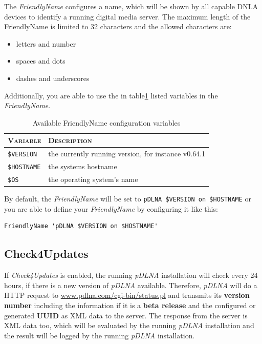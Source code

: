 \documentclass[a4paper,oneside,10pt]{report}
\newenvironment{colframefile}{%
  \begin{Sbox}
    \begin{minipage}{.99\columnwidth}
}{%
  \end{minipage}
  \end{Sbox}
  \begin{center}
    \fcolorbox{black}{Yellow}{\TheSbox}
  \end{center}
}
\newcommand{\pDLNAversion}{0.64.1}
\begin{document}
The {\em FriendlyName} configures a name, which will be shown by all capable DNLA devices to identify a running digital media server. The maximum length of the {FriendlyName} is limited to 32 characters and the allowed characters are:
\begin{itemize}
	\item letters and number
	\item spaces and dots
	\item dashes and underscores
\end{itemize}

Additionally, you are able to use the in table\ref{tab:AvailableFriendlyNameVariables} listed variables in the {\em FriendlyName}.

\begin{table}
	\centering
	\begin{tabular}{|p{7em}|p{25em}|}
		\hline
		\textsc{Variable} 	& \textsc{Description}\\
		\hline
		\hline
		\verb|$VERSION| 		& the currently running version, for instance v\pDLNAversion \\
		\hline
		\verb|$HOSTNAME| 		& the systems hostname \\
		\hline
		\verb|$OS| 					& the operating system's name \\
		\hline
	\end{tabular}
	\caption{Available FriendlyName configuration variables}
	\label{tab:AvailableFriendlyNameVariables}
\end{table}

By default, the {\em FriendlyName} will be set to \verb|pDLNA $VERSION on $HOSTNAME| or you are able to define your {\em FriendlyName} by configuring it like this:

\begin{colframefile}
\begin{verbatim}
FriendlyName 'pDLNA $VERSION on $HOSTNAME'
\end{verbatim}
\end{colframefile}

\subsection{Check4Updates}
\label{config-check4updates}

If {\em Check4Updates} is enabled, the running {\em pDLNA} installation will check every 24 hours, if there is a new version of {\em pDLNA} available. Therefore, {\em pDLNA} will do a HTTP request to \url{www.pdlna.com/cgi-bin/status.pl} and transmits its \textbf{version number} including the information if it is a \textbf{beta release} and the configured or generated \textbf{UUID} as XML data to the server. The response from the server is XML data too, which will be evaluated by the running {\em pDLNA} installation and the result will be logged by the running {\em pDLNA} installation.
\end{document}
